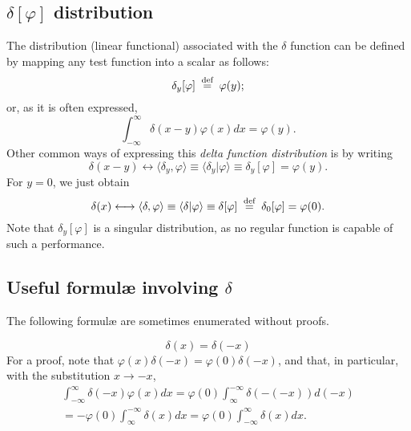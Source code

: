\subsection{$\delta \left[ \varphi \right]$ distribution}

The distribution (linear functional) associated with the $\delta$ function
can be defined by mapping any test function into a scalar as follows:
\begin{equation}
\delta_y [\varphi ]\stackrel{{\tiny \textrm{ def }}}{=}\varphi (y);
\label{2018-m-ch-di-delta}
\end{equation}
or, as it is often expressed,
\begin{equation}
\int_{-\infty}^\infty
\delta(x-y) \varphi (x) dx = \varphi(y).
\end{equation}
Other common ways of expressing this {\em delta function distribution} is by writing
\begin{equation}
\delta(x-y) \longleftrightarrow
\langle \delta_y , \varphi \rangle \equiv
\langle \delta_y \vert \varphi \rangle \equiv
\delta_y [\varphi] = \varphi (y).
\end{equation}
For $y=0$, we just obtain
\begin{equation}
\delta(x) \longleftrightarrow
\langle \delta , \varphi \rangle \equiv
\langle \delta \vert \varphi \rangle \equiv
\delta [\varphi] \stackrel{{\tiny \textrm{ def }}}{=} \delta_0 [\varphi] =  \varphi (0).
\end{equation}
Note that $\delta_y[\varphi]$ is a singular distribution,
as no regular function is capable of such a performance.



\subsection{Useful formul\ae{} involving $\delta$}

The following formul\ae{} are sometimes enumerated without proofs.


 \begin{equation}
 \delta (x)=\delta (-x)
 \end{equation}
{\color{OliveGreen}
\bproof
For a proof, note that $\varphi (x)\delta (-x) = \varphi (0)\delta (-x)$, and that, in particular,
with the substitution $x \rightarrow -x$,
 \begin{equation}
 \begin{split}
\int _{-\infty}^\infty \delta (-x)  \varphi(x) dx   =
 \varphi(0) \int _\infty ^{-\infty}\delta (-(-x))  d(-x) \\   =
-\varphi(0) \int _\infty ^{-\infty}\delta (x)  d x     =
\varphi(0) \int _{-\infty}^\infty \delta (x)  d x .
 \end{split}
 \end{equation}
\eproof
}


